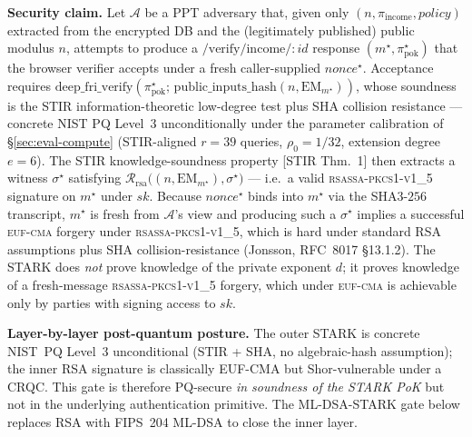 \documentclass[11pt,a4paper]{article}
\begin{document}
\textbf{Security claim.}  Let $\mathcal{A}$ be a
PPT adversary that, given only $(n,
\pi_{\mathrm{income}}, \mathit{policy})$ extracted from the
encrypted DB and the (legitimately published) public modulus
$n$, attempts to produce a
$/\mathrm{verify}/\mathrm{income}/{:}\mathit{id}$ response
$(m^{\star}, \pi_{\mathrm{pok}}^{\star})$ that the browser
verifier accepts under a fresh caller\nobreakdash-supplied
$\mathit{nonce}^{\star}$.  Acceptance requires
$\mathrm{deep\_fri\_verify}(\pi_{\mathrm{pok}}^{\star};\,
\mathrm{public\_inputs\_hash}(n, \mathrm{EM}_{m^{\star}}))$,
whose soundness is the STIR information\nobreakdash-theoretic
low\nobreakdash-degree test plus SHA collision
resistance — concrete NIST PQ Level~3 unconditionally under
the parameter calibration of \S\ref{sec:eval-compute}
(STIR\nobreakdash-aligned $r=39$ queries, $\rho_0=1/32$,
extension degree $e=6$).  The STIR knowledge\nobreakdash-soundness
property [STIR Thm.~1] then extracts a witness $\sigma^{\star}$
satisfying
$\mathcal{R}_{\mathrm{rsa}}\bigl((n,
\mathrm{EM}_{m^{\star}}),\sigma^{\star}\bigr)$ — i.e.\ a
valid \textsc{rsassa\nobreakdash-pkcs1\nobreakdash-v1\_5}
signature on $m^{\star}$ under $\mathit{sk}$.  Because
$\mathit{nonce}^{\star}$ binds into $m^{\star}$ via the
SHA3\nobreakdash-$256$ transcript, $m^{\star}$ is fresh from
$\mathcal{A}$'s view and producing such a $\sigma^{\star}$
implies a successful \textsc{euf\nobreakdash-cma} forgery
under \textsc{rsassa\nobreakdash-pkcs1\nobreakdash-v1\_5}, which
is hard under standard RSA assumptions plus
SHA collision\nobreakdash-resistance
(Jonsson, RFC~8017 §13.1.2).  The STARK does \emph{not}
prove knowledge of the private exponent $d$; it proves
knowledge of a fresh\nobreakdash-message
\textsc{rsassa\nobreakdash-pkcs1\nobreakdash-v1\_5} forgery,
which under \textsc{euf\nobreakdash-cma} is achievable only by
parties with signing access to $\mathit{sk}$.

\textbf{Layer\nobreakdash-by\nobreakdash-layer post\nobreakdash-quantum
posture.}  The outer STARK is concrete NIST~PQ Level~3
unconditional (STIR + SHA, no algebraic\nobreakdash-hash
assumption); the inner RSA signature is
classically EUF\nobreakdash-CMA but Shor\nobreakdash-vulnerable
under a CRQC.  This gate is therefore PQ\nobreakdash-secure
\emph{in soundness of the STARK PoK} but not in the underlying
authentication primitive.  The ML\nobreakdash-DSA\nobreakdash-STARK
gate below replaces RSA with FIPS~204 ML\nobreakdash-DSA
to close the inner layer.
\end{document}
